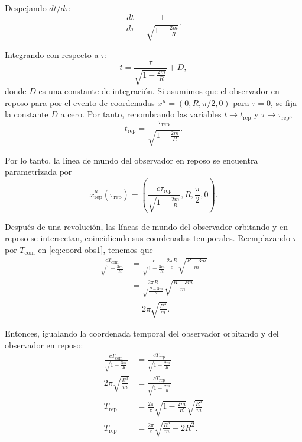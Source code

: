 \documentclass[letterpaper,11pt]{article}
\begin{document}
Despejando $dt/d\tau$:
\begin{equation}
\frac{dt}{d\tau} = \frac{1}{\sqrt{1 - \frac{2m}{R}}}.
\end{equation}

Integrando con respecto a $\tau$:
\begin{equation}
t = \frac{\tau}{\sqrt{1 - \frac{2m}{R}}} + D,
\end{equation}
donde $D$ es una constante de integración. Si asumimos que el observador en reposo para por el evento de coordenadas $x^{\mu} = (0,R,\pi/2,0)$ para $\tau = 0$, se fija la constante $D$ a cero. Por tanto, renombrando las variables $t \to t_{\text{rep}}$ y $\tau \to \tau_{\text{rep}}$,
\begin{equation}
t_{\text{rep}} = \frac{\tau_{\text{rep}}}{\sqrt{1 - \frac{2m}{R}}}.
\end{equation}

Por lo tanto, la línea de mundo del observador en reposo se encuentra parametrizada por
\begin{equation}
x_{\text{rep}}^{\mu}(\tau_{\text{rep}}) = \left(\frac{c\tau_{\text{rep}}}{\sqrt{1 - \frac{2m}{R}}},R,\frac{\pi}{2},0 \right). \label{eq:coord-obs2}
\end{equation}

Después de una revolución, las líneas de mundo del observador orbitando y en reposo se intersectan, coincidiendo sus coordenadas temporales. Reemplazando $\tau$ por $T_{\text{com}}$ en \eqref{eq:coord-obs1}, tenemos que 
\begin{align}
\frac{cT_{\text{com}}}{\sqrt{1 - \frac{3m}{R}}} &= \frac{c}{\sqrt{1 - \frac{3m}{R}}} \frac{2\pi R}{c} \sqrt{\frac{R-3m}{m}} \nonumber\\
&= \frac{2\pi R}{\sqrt{\frac{R-3m}{R}}} \sqrt{\frac{R-3m}{m}} \nonumber\ \\
&= 2\pi \sqrt{\frac{R^3}{m}}.
\end{align}

Entonces, igualando la coordenada temporal del observador orbitando y del observador en reposo:
\begin{align}
\frac{cT_{\text{com}}}{\sqrt{1 - \frac{3m}{R}}} &= \frac{cT_{\text{rep}}}{\sqrt{1 - \frac{2m}{R}}} \\
2\pi \sqrt{\frac{R^3}{m}} &= \frac{cT_{\text{rep}}}{\sqrt{1 - \frac{2m}{R}}}  \\
T_{\text{rep}} &= \frac{2\pi}{c} \sqrt{1 - \frac{2m}{R}} \sqrt{\frac{R^3}{m}} \\
T_{\text{rep}} &= \frac{2\pi}{c} \sqrt{\frac{R^3}{m} - 2R^2}.
\end{align}
\end{document}
